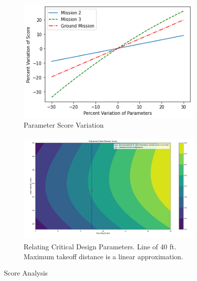   \begin{figure}[htb!]
    \begin{subfigure}[b]{0.49\textwidth}
        \centering
        \includegraphics[width=\textwidth]{Images/DBF Mission Variation.png}
        \caption{Parameter Score Variation}
        \label{fig:score_2d}
    \end{subfigure}
    \begin{subfigure}[b]{0.49\textwidth}
        \centering
        \includegraphics[width=\textwidth, height=5.5cm]{Images/final_selection_graph.JPG}
        \caption{Relating Critical Design Parameters. Line of 40 ft. Maximum takeoff distance is a linear approximation.}
        \label{fig:score_3d}
    \end{subfigure}
    \caption{Score Analysis}
    \label{fig:scoring}
\end{figure}
